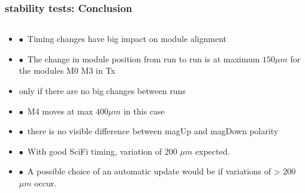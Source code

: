 \documentclass[aspectratio=1610, 12pt, xcolor=dvipsnames]{beamer}
\begin{document}
\begin{frame}\frametitle{stability tests: Conclusion}
  \begin{columns}
    \begin{column}[c]{\textwidth}
      \begin{itemize}
        \item $\bullet$\, Timing changes have big impact on module alignment
        \item $\bullet$\, The change in module position from run to run is at maximum $150 \mu m$ for the modules M0 \to M3 in Tx
        \item \to only if there are no big changes between runs
        \item $\bullet$\, M4 moves at max $400 \mu m$ in this case
        \item $\bullet$\, there is no visible difference between magUp and magDown polarity
        \item $\bullet$\, With good SciFi timing, variation of 200 $\mu m$ expected.
        \item $\bullet$\, A possible choice of an automatic update would be if variations of > 200 $\mu m$ occur.
      \end{itemize}
    \end{column}
  \end{columns}
\end{frame}
\end{document}
